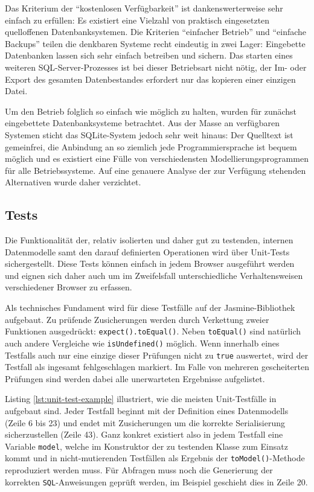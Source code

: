 Das Kriterium der "`kostenlosen Verfügbarkeit"' ist dankenswerterweise sehr einfach zu erfüllen: Es existiert eine Vielzahl von praktisch eingesetzten quelloffenen Datenbanksystemen. Die Kriterien "`einfacher Betrieb"' und "`einfache Backups"' teilen die denkbaren Systeme recht eindeutig in zwei Lager: Eingebette Datenbanken lassen sich sehr einfach betreiben und sichern. Das starten eines weiteren SQL-Server-Prozesses ist bei dieser Betriebsart nicht nötig, der Im- oder Export des gesamten Datenbestandes erfordert nur das kopieren einer einzigen Datei.

Um den Betrieb folglich so einfach wie möglich zu halten, wurden für \idename{} zunächst eingebettete Datenbanksysteme betrachtet. Aus der Masse an verfügbaren Systemen sticht das SQLite-System jedoch sehr weit hinaus: Der Quelltext ist gemeinfrei, die Anbindung an so ziemlich jede Programmiersprache ist bequem möglich und es existiert eine Fülle von verschiedensten Modellierungsprogrammen für alle Betriebssysteme. Auf eine genauere Analyse der zur Verfügung stehenden Alternativen wurde daher verzichtet.

\subsection{Tests}

Die Funktionalität der, relativ isolierten und daher gut zu testenden, internen Datenmodelle samt den darauf definierten Operationen wird über Unit-Tests sichergestellt. Diese Tests können einfach in jedem Browser ausgeführt werden und eignen sich daher auch um im Zweifelsfall unterschiedliche Verhaltensweisen verschiedener Browser zu erfassen.

Als technisches Fundament wird für diese Testfälle auf der Jasmine-Bibliothek aufgebaut. Zu prüfende Zusicherungen werden durch Verkettung zweier Funktionen ausgedrückt: \texttt{expect().toEqual()}. Neben \texttt{toEqual()} sind natürlich auch andere Vergleiche wie \texttt{isUndefined()} möglich. Wenn innerhalb eines Testfalls auch nur eine einzige dieser Prüfungen nicht zu \texttt{true} auswertet, wird der Testfall als ingesamt fehlgeschlagen markiert. Im Falle von mehreren gescheiterten Prüfungen sind werden dabei alle unerwarteten Ergebnisse aufgelistet.

Listing \ref{lst:unit-test-example} illustriert, wie die meisten Unit-Testfälle in \idename{} aufgebaut sind. Jeder Testfall beginnt mit der Definition eines Datenmodells (Zeile 6 bis 23) und endet mit Zusicherungen um die korrekte Serialisierung sicherzustellen (Zeile 43). Ganz konkret existiert also in jedem Testfall eine Variable \texttt{model}, welche im Konstruktor der zu testenden Klasse zum Einsatz kommt und in nicht-mutierenden Testfällen als Ergebnis der \texttt{toModel()}-Methode reproduziert werden muss. Für Abfragen muss noch die Generierung der korrekten \texttt{SQL}-Anweisungen geprüft werden, im Beispiel geschieht dies in Zeile 20.

